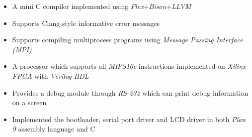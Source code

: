 \documentclass[11pt,a4paper,roman]{moderncv} %
\begin{document}
{
	\begin{itemize}
		\item A mini C compiler implemented using \emph{Flex}+\emph{Bison}+\emph{LLVM}
		\item Supports Clang-style informative error messages
		\item Supports compiling multiprocess programs using  \textit{Message Passing Interface (MPI)}
	\end{itemize}
}

{
	\begin{itemize}
		\item A processor which supports all \emph{MIPS16e} instructions implemented on \emph{Xilinx FPGA} with \emph{Verilog HDL}
		\item Provides a debug module through \emph{RS-232} which can print debug information on a screen
	\end{itemize}
}

{
	\begin{itemize}
		\item Implemented the bootloader, serial port driver and LCD driver  in both \emph{Plan 9} assembly language and C
	\end{itemize}
}


%
\end{document}
